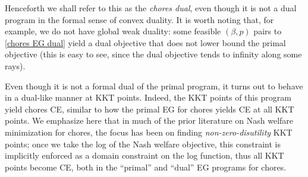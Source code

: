 \documentclass[format=acmsmall,authorversion]{acmart}
\begin{document}
Henceforth we shall refer to this as the \emph{chores dual}, even though it is not a dual program in the formal sense of convex duality.
It is worth noting that, for example, we do not have global weak duality: some feasible $(\beta,p)$ pairs to \ref{chores EG dual} yield a dual objective that does not lower bound the primal objective (this is easy to see, since the dual objective tends to infinity along some rays).

Even though it is not a formal dual of the primal program, it turns out to behave in a dual-like manner at KKT points.
Indeed, the KKT points of this program yield chores CE, similar to how the primal EG for chores yields CE at all KKT points. 
We emphasize here that in much of the prior literature on Nash welfare minimization for chores, the focus has been on finding \emph{non-zero-disutility} KKT points; once we take the log of the Nash welfare objective, this constraint is implicitly enforced as a domain constraint on the log function, thus all KKT points become CE, both in the ``primal'' and ``dual'' EG programs for chores.
\end{document}
